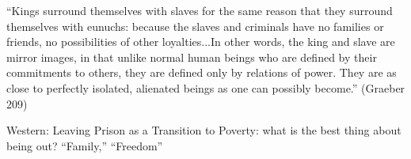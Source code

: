 \documentclass[10pt,a4paper]{article}
\begin{document}
 ``Kings surround themselves with slaves for the same reason that they surround 
 themselves with eunuchs: because the slaves and criminals have no families or friends, 
 no possibilities of other loyalties...In other words, the king and slave are mirror images, 
 in that unlike normal human beings who are defined by their commitments to others, they are 
 defined only by relations of power. They are as close to perfectly isolated, alienated 
 beings as one can possibly become.'' (Graeber 209)
 
 Western: Leaving Prison as a Transition to Poverty: what is the best thing about being out?
 ``Family,'' ``Freedom''
 
\end{document}

